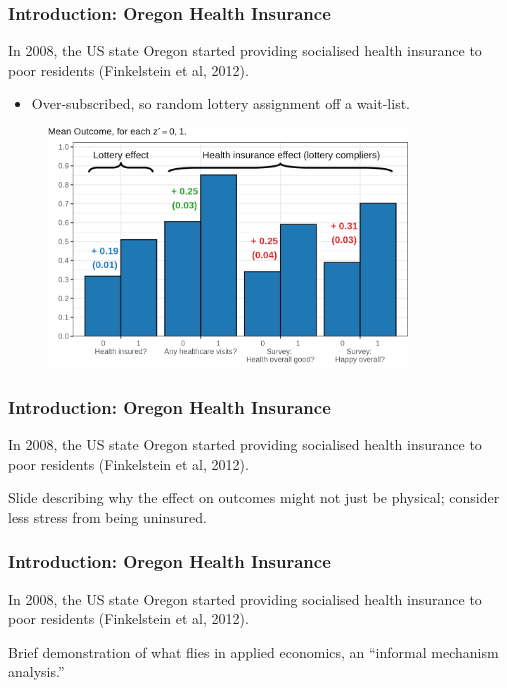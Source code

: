 \documentclass[dvipsnames]{beamer} %
\begin{document}
\begin{frame}[noframenumbering]
    \frametitle{Introduction: Oregon Health Insurance}
    In 2008, the US state Oregon started providing socialised health insurance to poor residents (Finkelstein et al, 2012).
    \begin{itemize}
        \item Over-subscribed, so random lottery assignment off a wait-list.
    \end{itemize}
    \vspace{-0.5cm}
    \begin{figure}
        \centering
        \singlespacing
        \includegraphics[width=0.85\textwidth]{
            presentation-files/figures/insurance-effects.png}
    \end{figure}
\end{frame}
\begin{frame}[noframenumbering]
    \frametitle{Introduction: Oregon Health Insurance}
    In 2008, the US state Oregon started providing socialised health insurance to poor residents (Finkelstein et al, 2012).
    
    \vfill
    Slide describing why the effect on outcomes might not just be physical; consider less stress from being uninsured.
\end{frame}
\begin{frame}[noframenumbering]
    \frametitle{Introduction: Oregon Health Insurance}
    In 2008, the US state Oregon started providing socialised health insurance to poor residents (Finkelstein et al, 2012).
    
    \vfill
    Brief demonstration of what flies in applied economics, an ``informal mechanism analysis.''
\end{frame}
\end{document}
